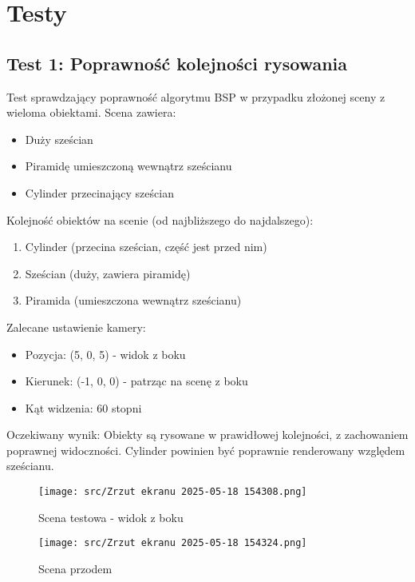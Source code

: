 \documentclass[a4paper,12pt]{article}
\begin{document}
\section{Testy}

\subsection{Test 1: Poprawność kolejności rysowania}
Test sprawdzający poprawność algorytmu BSP w przypadku złożonej sceny z wieloma obiektami. Scena zawiera:
\begin{itemize}
    \item Duży sześcian
    \item Piramidę umieszczoną wewnątrz sześcianu
    \item Cylinder przecinający sześcian
\end{itemize}

Kolejność obiektów na scenie (od najbliższego do najdalszego):
\begin{enumerate}
    \item Cylinder (przecina sześcian, część jest przed nim)
    \item Sześcian (duży, zawiera piramidę)
    \item Piramida (umieszczona wewnątrz sześcianu)
\end{enumerate}

Zalecane ustawienie kamery:
\begin{itemize}
    \item Pozycja: (5, 0, 5) - widok z boku
    \item Kierunek: (-1, 0, 0) - patrząc na scenę z boku
    \item Kąt widzenia: 60 stopni
\end{itemize}

Oczekiwany wynik: Obiekty są rysowane w prawidłowej kolejności, z zachowaniem poprawnej widoczności. Cylinder powinien być poprawnie renderowany względem sześcianu.

\begin{figure}[h]
    \centering
    \begin{minipage}{0.48\textwidth}
        \centering
        \texttt{[image: src/Zrzut ekranu 2025-05-18 154308.png]}
        \caption{Scena testowa - widok z boku}
    \end{minipage}
    \hfill
    \begin{minipage}{0.48\textwidth}
        \centering
        \texttt{[image: src/Zrzut ekranu 2025-05-18 154324.png]}
        \caption{Scena przodem}
    \end{minipage}
\end{figure}
\end{document}
